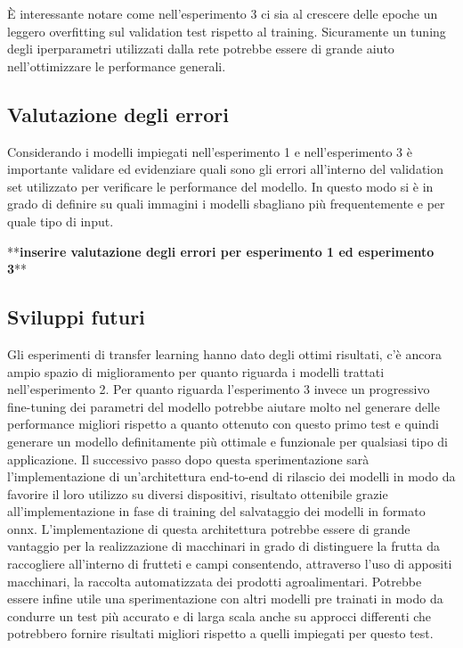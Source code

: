 È interessante notare come nell'esperimento 3 ci sia al crescere delle epoche un leggero overfitting sul validation test rispetto al training. Sicuramente un tuning degli iperparametri utilizzati dalla rete potrebbe essere di grande aiuto nell'ottimizzare le performance generali.

\subsection{Valutazione degli errori}

Considerando i modelli impiegati nell'esperimento 1 e nell'esperimento 3 è importante validare ed evidenziare quali sono gli errori all'interno del validation set utilizzato per verificare le performance del modello.
In questo modo si è in grado di definire su quali immagini i modelli sbagliano più frequentemente e per quale tipo di input.

**\textbf{inserire valutazione degli errori per esperimento 1 ed esperimento 3}**


\subsection{Sviluppi futuri}
Gli esperimenti di transfer learning hanno dato degli ottimi risultati, c'è ancora ampio spazio di miglioramento per quanto riguarda i modelli trattati nell'esperimento 2. Per quanto riguarda l'esperimento 3 invece un progressivo fine-tuning dei parametri del modello potrebbe aiutare molto nel generare delle performance migliori rispetto a quanto ottenuto con questo primo test e quindi generare un modello definitamente più ottimale e funzionale per qualsiasi tipo di applicazione.
Il successivo passo dopo questa sperimentazione sarà l'implementazione di un'architettura end-to-end di rilascio dei modelli in modo da favorire il loro utilizzo su diversi dispositivi, risultato ottenibile grazie all'implementazione in fase di training del salvataggio dei modelli in formato onnx.
L'implementazione di questa architettura potrebbe essere di grande vantaggio per la realizzazione di macchinari in grado di distinguere la frutta da raccogliere all'interno di frutteti e campi consentendo, attraverso l'uso di appositi macchinari, la raccolta automatizzata dei prodotti agroalimentari.
Potrebbe essere infine utile una sperimentazione con altri modelli pre trainati in modo da condurre un test più accurato e di larga scala anche su approcci differenti che potrebbero fornire risultati migliori rispetto a quelli impiegati per questo test.


